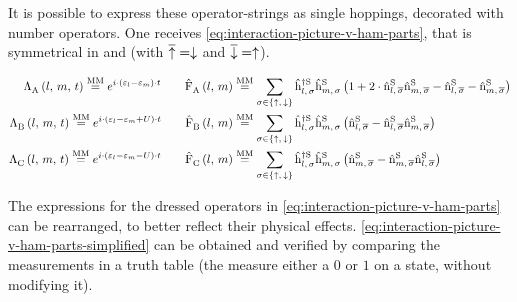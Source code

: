It is possible to express these operator-strings as single hoppings, decorated with number operators. One receives \autoref{eq:interaction-picture-v-ham-parts}, that is symmetrical in \up and \down (with $\overline{\uparrow} = \downarrow$ and  $\overline{\downarrow} = \uparrow$).

\begin{equation}
    \label{eq:interaction-picture-v-ham-parts}
    \begin{split}
        \VhamiltonianAnalyticalPart{A}{l}{m}{t} \stackrel{\text{MM}}{=} e^{i\cdot \left(\epsl-\epsl[m]\right)\cdot t} \qquad
        \VhamiltonianOperatorPart{A}{l}{m} &\stackrel{\text{MM}}{=} 
        \lsum[\sigma \in \left\{\up,\,\down\right\}]
        \withspinhcop[\schroedingerPicture]{l}{\sigma}{\dagger}\withspinhcop[\schroedingerPicture]{m}{\sigma}{}
        \left(
            1+
            2 \cdot \nop[\schroedingerPicture]{l}{\overline{\sigma}}\nop[\schroedingerPicture]{m}{\overline{\sigma}}
            - \nop[\schroedingerPicture]{l}{\overline{\sigma}}
            - \nop[\schroedingerPicture]{m}{\overline{\sigma}}
        \right)
        \\
        \VhamiltonianAnalyticalPart{B}{l}{m}{t} \stackrel{\text{MM}}{=} e^{i\cdot \left(\epsl-\epsl[m] + U\right)\cdot t} \qquad
        \VhamiltonianOperatorPart{B}{l}{m} &\stackrel{\text{MM}}{=} 
        \lsum[\sigma \in \left\{\up,\,\down\right\}]        
        \withspinhcop[\schroedingerPicture]{l}{\sigma}{\dagger}\withspinhcop[\schroedingerPicture]{m}{\sigma}{}
        \left(
            \nop[\schroedingerPicture]{l}{\overline{\sigma}}
            - \nop[\schroedingerPicture]{l}{\overline{\sigma}}\nop[\schroedingerPicture]{m}{\overline{\sigma}}
        \right)
        \\
        \VhamiltonianAnalyticalPart{C}{l}{m}{t} \stackrel{\text{MM}}{=} e^{i\cdot \left(\epsl-\epsl[m] - U\right)\cdot t} \qquad
        \VhamiltonianOperatorPart{C}{l}{m} &\stackrel{\text{MM}}{=} 
        \lsum[\sigma \in \left\{\up,\,\down\right\}]
        \withspinhcop[\schroedingerPicture]{l}{\sigma}{\dagger}\withspinhcop[\schroedingerPicture]{m}{\sigma}{}
        \left(
            \nop[\schroedingerPicture]{m}{\overline{\sigma}}
            - \nop[\schroedingerPicture]{m}{\overline{\sigma}}\nop[\schroedingerPicture]{l}{\overline{\sigma}}
        \right)
        \\
    \end{split}
\end{equation}

The expressions for the dressed operators in \autoref{eq:interaction-picture-v-ham-parts} can be rearranged, to better reflect their physical effects.
\autoref{eq:interaction-picture-v-ham-parts-simplified} can be obtained and verified by comparing the measurements in a truth table (the \nop[\schroedingerPicture]{\ast}{\ast} measure either a $0$ or $1$ on a state, without modifying it).


